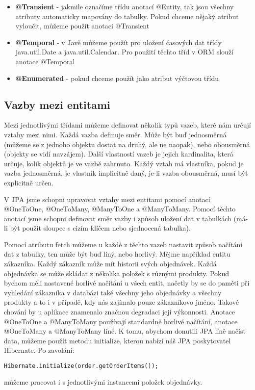 \documentclass[122pt,oneside]{fithesis}
\begin{document}
\begin{itemize}
  \item{\bf @Transient} - jakmile označíme třídu anotací @Entity, tak jsou všechny atributy automaticky mapovány do tabulky. Pokud chceme nějaký atribut vyloučit, můžeme použít anotaci @Transient
  \item{\bf @Temporal} - v Javě můžeme použít pro uložení časových dat třídy java.util.Date a java.util.Calendar. Pro použití těchto tříd v ORM slouží anotace @Temporal
  \item{\bf @Enumerated} - pokud chceme použít jako atribut výčtovou třídu
\end{itemize}

\subsection{Vazby mezi entitami}

Mezi jednotlivými třídami můžeme definovat několik typů vazeb, které nám určují vztahy mezi nimi. Každá vazba definuje směr. Může být buď jednosměrná (můžeme se z jednoho objektu dostat na druhý, ale ne naopak), nebo obousměrná (objekty se vidí navzájem). Další vlastností vazeb je jejich kardinalita, která určuje, kolik objektů je ve vazbě zahrnuto. Každý vztah má vlastníka, pokud je vazba jednosměrná, je vlastník implicitně daný, je-li vazba obousměrná, musí být explicitně určen. 

V JPA jsme schopni upravovat vztahy mezi entitami pomocí anotací @OneToOne, @OneToMany, @ManyToOne a @ManyToMany. Pomocí těchto anotací jsme schopni definovat směr vazby i způsob uložení dat v tabulkách (má-li být použit sloupec s cizím klíčem nebo sjednocená tabulka).

Pomocí atributu fetch můžeme u každé z těchto vazeb nastavit způsob načítání dat z tabulky, ten může být buď líný, nebo horlivý. Mějme například entitu zákazníka. Každý zákazník může mít historii svých objednávek. Každá objednávka se může skládat z několika položek s různými produkty. Pokud bychom měli nastavené horlivé načítání u všech entit, načetly by se do paměti při vyhledání zákazníka v databázi také všechny jeho objednávky a všechny produkty a to i v případě, kdy nás zajímalo pouze zákazníkovo jméno. Takové chování by u aplikace znamenalo značnou degradaci její výkonnosti. Anotace @OneToOne a @ManyToMany používají standardně horlivé načítání, anotace @OneToMany a @ManyToMany líné. K tomu, abychom donutili JPA líně načíst data, můžeme použít metodu initialize, kterou nabízí náš JPA poskytovatel Hibernate. Po zavolání:
\begin{lstlisting}
Hibernate.initialize(order.getOrderItems());
\end{lstlisting}
	můžeme pracovat i s jednotlivými instancemi položek objednávky.
\end{document}
